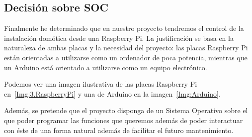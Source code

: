 \begin{landscape}
\begin{table}[]
\centering
{}
\caption{Comparativa Arduinos}
\label{tab:comp_Arduino}
\end{table}
\end{landscape}

\subsection{Decisión sobre SOC}\label{4.DecisionSOC}
Finalmente he determinado que en nuestro proyecto tendremos el control de la instalación domótica desde una Raspberry Pi\cite{misc:RbPWeb}. La justificación se basa en la naturaleza de ambas placas y la necesidad del proyecto: las placas Raspberry Pi están orientadas a utilizarse como un ordenador de poca potencia, mientras que un Arduino está orientado a utilizarse como un equipo electrónico. 

Podemos ver una imagen ilustrativa de las placas Raspberry Pi en~\ref{Img:3.RaspberryPi} y una de Arduino en la imagen~\ref{Img:Arduino}.

Además, se pretende que el proyecto disponga de un Sistema Operativo sobre el que poder programar las funciones que queremos además de poder interactuar con éste de una forma natural además de facilitar el futuro mantenimiento.

